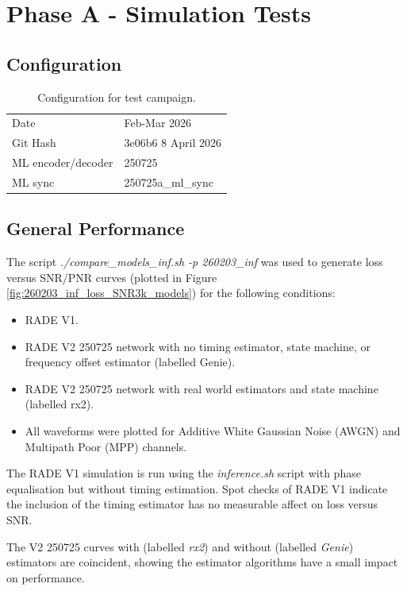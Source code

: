 \documentclass{article}
\begin{document}
\section{Phase A - Simulation Tests}

\subsection{Configuration}

\begin{table} [h]
\caption{Configuration for test campaign.}
\label{tab:config}
\centering
\begin{tabular}{ l | l }
 \hline
  Date  & Feb-Mar 2026 \\
  Git Hash & 3e06b6 8 April 2026 \\
  ML encoder/decoder & 250725 \\
  ML sync & 250725a\_ml\_sync \\
 \hline
\end{tabular}
\end{table}

\subsection{General Performance}

The script \emph{./compare\_models\_inf.sh -p 260203\_inf} was used to generate loss versus SNR/PNR curves (plotted in Figure \ref{fig:260203_inf_loss_SNR3k_models}) for the following conditions:
\begin{itemize}
\item RADE V1.
\item RADE V2 250725 network with no timing estimator, state machine, or frequency offset estimator (labelled Genie).
\item RADE V2 250725 network with real world estimators and state machine (labelled rx2).
\item All waveforms were plotted for Additive White Gaussian Noise (AWGN) and Multipath Poor (MPP) channels.
\end{itemize}

The RADE V1 simulation is run using the \emph{inference.sh} script with phase equalisation but without timing estimation.  Spot checks of RADE V1 indicate the inclusion of the timing estimator has no measurable affect on loss versus SNR.

The V2 250725 curves with (labelled \emph{rx2}) and without (labelled \emph{Genie}) estimators are coincident, showing the estimator algorithms have a small impact on performance.
\end{document}
